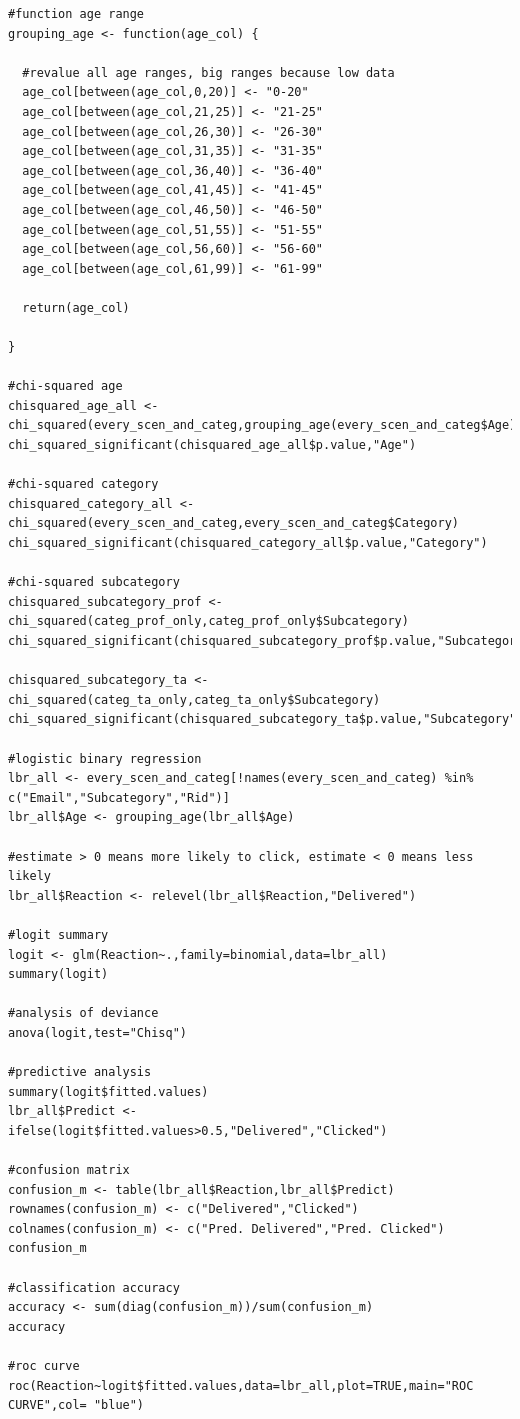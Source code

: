 \documentclass[a4paper]{article}
\begin{document}
\begin{lstlisting}
#function age range
grouping_age <- function(age_col) {
  
  #revalue all age ranges, big ranges because low data
  age_col[between(age_col,0,20)] <- "0-20"
  age_col[between(age_col,21,25)] <- "21-25"
  age_col[between(age_col,26,30)] <- "26-30"
  age_col[between(age_col,31,35)] <- "31-35"
  age_col[between(age_col,36,40)] <- "36-40"
  age_col[between(age_col,41,45)] <- "41-45"
  age_col[between(age_col,46,50)] <- "46-50"
  age_col[between(age_col,51,55)] <- "51-55"
  age_col[between(age_col,56,60)] <- "56-60"
  age_col[between(age_col,61,99)] <- "61-99"
  
  return(age_col)
  
}

#chi-squared age
chisquared_age_all <- chi_squared(every_scen_and_categ,grouping_age(every_scen_and_categ$Age))
chi_squared_significant(chisquared_age_all$p.value,"Age")

#chi-squared category
chisquared_category_all <- chi_squared(every_scen_and_categ,every_scen_and_categ$Category)
chi_squared_significant(chisquared_category_all$p.value,"Category")

#chi-squared subcategory
chisquared_subcategory_prof <- chi_squared(categ_prof_only,categ_prof_only$Subcategory)
chi_squared_significant(chisquared_subcategory_prof$p.value,"Subcategory")

chisquared_subcategory_ta <- chi_squared(categ_ta_only,categ_ta_only$Subcategory)
chi_squared_significant(chisquared_subcategory_ta$p.value,"Subcategory")

#logistic binary regression
lbr_all <- every_scen_and_categ[!names(every_scen_and_categ) %in% c("Email","Subcategory","Rid")]
lbr_all$Age <- grouping_age(lbr_all$Age)

#estimate > 0 means more likely to click, estimate < 0 means less likely
lbr_all$Reaction <- relevel(lbr_all$Reaction,"Delivered")

#logit summary
logit <- glm(Reaction~.,family=binomial,data=lbr_all)
summary(logit)

#analysis of deviance
anova(logit,test="Chisq")

#predictive analysis
summary(logit$fitted.values)
lbr_all$Predict <- ifelse(logit$fitted.values>0.5,"Delivered","Clicked")

#confusion matrix
confusion_m <- table(lbr_all$Reaction,lbr_all$Predict)
rownames(confusion_m) <- c("Delivered","Clicked")
colnames(confusion_m) <- c("Pred. Delivered","Pred. Clicked")
confusion_m

#classification accuracy
accuracy <- sum(diag(confusion_m))/sum(confusion_m)
accuracy

#roc curve
roc(Reaction~logit$fitted.values,data=lbr_all,plot=TRUE,main="ROC CURVE",col= "blue")
    
\end{lstlisting}
\end{document}
